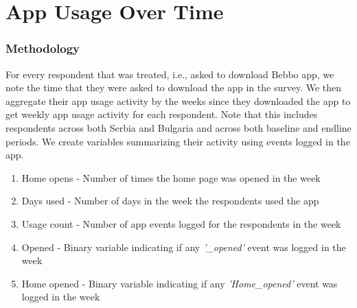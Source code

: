 \documentclass{article}
\begin{document}
\section*{App Usage Over Time}

\subsubsection*{Methodology}
For every respondent that was treated, i.e., asked to download Bebbo app, we note the time that they were asked to download the app in the survey. We then aggregate their app usage activity by the weeks since they downloaded the app to get weekly app usage activity for each respondent. Note that this includes respondents across both Serbia and Bulgaria and across both baseline and endline periods.
We create variables summarizing their activity using events logged in the app.

\begin{enumerate}
    \item Home opens - Number of times the home page was opened in the week
    \item Days used - Number of days in the week the respondents used the app
    \item Usage count - Number of app events logged for the respondents in the week
    \item Opened - Binary variable indicating if any \textit{'\_opened'} event was logged in the week
    \item Home opened - Binary variable indicating if any \textit{'Home\_opened'} event was logged in the week
\end{enumerate}
\end{document}
